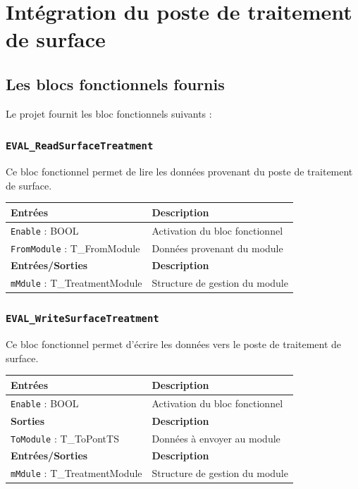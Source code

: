 \section{Intégration du poste de traitement de surface}
\subsection{Les blocs fonctionnels fournis}
Le projet fournit les bloc fonctionnels suivants : 

\subsubsection{\texttt{EVAL\_ReadSurfaceTreatment}}
Ce bloc fonctionnel permet de lire les données provenant du poste de traitement de surface. 

\begin{tabular}{l|l}
\textbf{Entrées} & \textbf{Description} \\\hline
\texttt{Enable} : BOOL  & Activation du bloc fonctionnel \\
\texttt{FromModule} : T\_FromModule & Données provenant du module \\\hline\hline
\textbf{Entrées/Sorties} & \textbf{Description} \\\hline
\texttt{mMdule} : T\_TreatmentModule & Structure de gestion du module \\\hline\hline
\end{tabular}

\subsubsection{\texttt{EVAL\_WriteSurfaceTreatment}}
Ce bloc fonctionnel permet d'écrire les données vers le poste de traitement de surface.


\begin{tabular}{l|l}
\textbf{Entrées} & \textbf{Description} \\\hline
\texttt{Enable} : BOOL  & Activation du bloc fonctionnel \\\hline\hline
\textbf{Sorties} & \textbf{Description} \\\hline
\texttt{ToModule} : T\_ToPontTS & Données à envoyer au module \\\hline\hline
\textbf{Entrées/Sorties} & \textbf{Description} \\\hline
\texttt{mMdule} : T\_TreatmentModule & Structure de gestion du module \\\hline\hline
\end{tabular}

